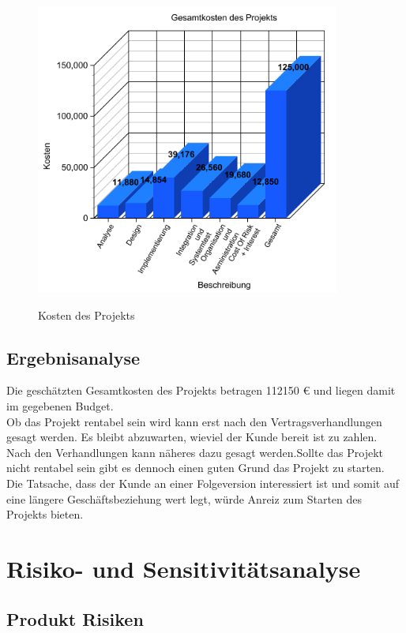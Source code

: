 \begin{figure}[H]
\centering
\includegraphics[width=10cm]{images/graph2.png}
\label{img:kost}
\caption{Kosten des Projekts}
\end{figure}

\section{Ergebnisanalyse}

Die geschätzten Gesamtkosten des Projekts betragen 112150 € und liegen damit im
gegebenen Budget.\\ Ob das Projekt rentabel sein wird kann erst nach den
Vertragsverhandlungen gesagt werden. Es bleibt abzuwarten, wieviel der Kunde
bereit ist zu zahlen. Nach den Verhandlungen kann näheres dazu gesagt
werden.\newline Sollte das Projekt nicht rentabel sein gibt es dennoch einen
guten Grund das Projekt zu starten. Die Tatsache, dass der Kunde an
einer Folgeversion interessiert ist und somit auf eine längere Geschäftsbeziehung wert legt, würde Anreiz zum Starten des Projekts bieten.

\chapter{Risiko- und Sensitivitätsanalyse}
\label{cha:risi}

\section{Produkt Risiken}
\label{sec:prorisk}

